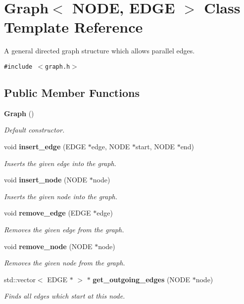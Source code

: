 \section{Graph$<$ NODE, EDGE $>$ Class Template Reference}
\label{classGraph}
A general directed graph structure which allows parallel edges.  


{\tt \#include $<$graph.h$>$}

\subsection*{Public Member Functions}
\begin{CompactItemize}
\item 
{\bf Graph} ()
\begin{CompactList}\small\item\em Default constructor. \item\end{CompactList}\item 
void {\bf insert\_\-edge} (EDGE $\ast$edge, NODE $\ast$start, NODE $\ast$end)
\begin{CompactList}\small\item\em Inserts the given edge into the graph. \item\end{CompactList}\item 
void {\bf insert\_\-node} (NODE $\ast$node)
\begin{CompactList}\small\item\em Inserts the given node into the graph. \item\end{CompactList}\item 
void {\bf remove\_\-edge} (EDGE $\ast$edge)
\begin{CompactList}\small\item\em Removes the given edge from the graph. \item\end{CompactList}\item 
void {\bf remove\_\-node} (NODE $\ast$node)
\begin{CompactList}\small\item\em Removes the given node from the graph. \item\end{CompactList}\item 
std::vector$<$ EDGE $\ast$ $>$ $\ast$ {\bf get\_\-outgoing\_\-edges} (NODE $\ast$node)
\begin{CompactList}\small\item\em Finds all edges which start at this node. \item\end{CompactList}\item 

\end{CompactItemize}
